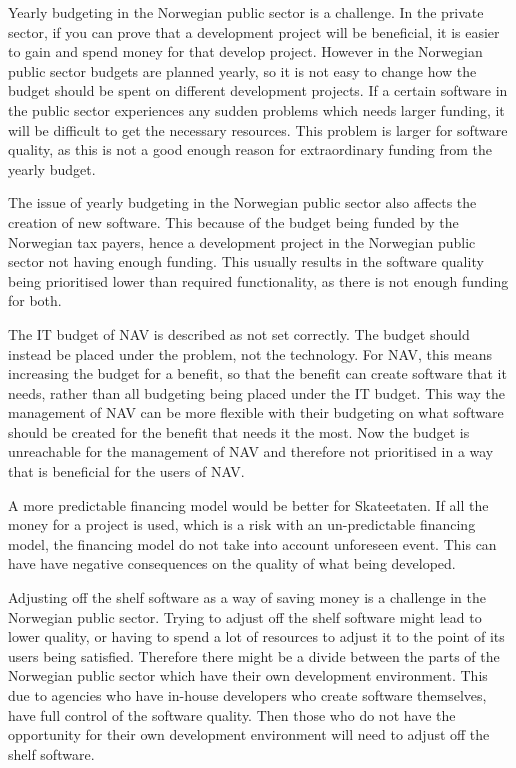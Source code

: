 Yearly budgeting in the Norwegian public sector is a challenge. In the private sector, if you can prove that a development project will be beneficial, it is easier to gain and spend money for that develop project. However in the Norwegian public sector budgets are planned yearly, so it is not easy to change how the budget should be spent on different development projects. If a certain software in the public sector experiences any sudden problems which needs larger funding, it will be difficult to get the necessary resources. This problem is larger for software quality, as this is not a good enough reason for extraordinary funding from the yearly budget. 

The issue of yearly budgeting in the Norwegian public sector also affects the creation of new software. This because of the budget being funded by the Norwegian tax payers, hence a development project in the Norwegian public sector not having enough funding. This usually results in the software quality being prioritised lower than required functionality, as there is not enough funding for both.

The IT budget of NAV is described as not set correctly. The budget should instead be placed under the problem, not the technology. For NAV, this means increasing the budget for a benefit, so that the benefit can create software that it needs, rather than all budgeting being placed under the IT budget. This way the management of NAV can be more flexible with their budgeting on what software should be created for the benefit that needs it the most. Now the budget is unreachable for the management of NAV and therefore not prioritised in a way that is beneficial for the users of NAV.

A more predictable financing model would be better for Skateetaten. If all the money for a project is used, which is a risk with an un-predictable financing model, the financing model do not take into account unforeseen event. This can have have negative consequences on the quality of what being developed.

Adjusting off the shelf software as a way of saving money is a challenge in the Norwegian public sector. Trying to adjust off the shelf software might lead to lower quality, or having to spend a lot of resources to adjust it to the point of its users being satisfied. Therefore there might be a divide between the parts of the Norwegian public sector which have their own development environment. This due to agencies who have in-house developers who create software themselves, have full control of the software quality. Then those who do not have the opportunity for their own development environment will need to adjust off the shelf software.


